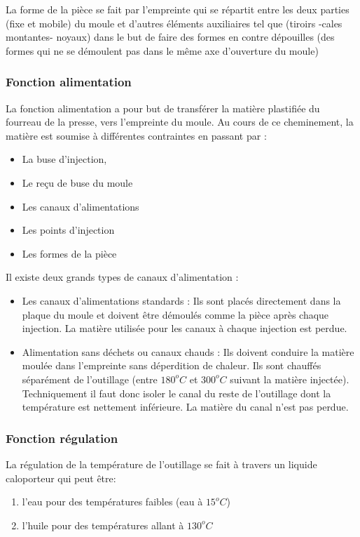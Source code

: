 \documentclass[11pt,oneside]{article}
\begin{document}
        La forme de la pièce se fait par l'empreinte qui se répartit entre les
deux parties (fixe 
et  mobile)  du  moule  et  d'autres  éléments  auxiliaires  tel  que  (tiroirs 
-cales  montantes-
noyaux)  dans  le  but  de  faire  des  formes  en  contre  dépouilles  (des 
formes  qui  ne  se 
démoulent pas dans le même axe d'ouverture du moule) 
        
\subsubsection{Fonction alimentation}

       La fonction alimentation a pour but de transférer la matière plastifiée
du fourreau de 
la presse, vers l'empreinte du moule. Au cours de ce cheminement, la matière est
soumise à 
différentes contraintes en passant par : 
\begin{itemize}
\item La buse d'injection, 
\item Le reçu de buse du moule 
\item Les canaux d'alimentations 
\item Les points d'injection 
\item Les formes de la pièce 
\end{itemize}

        Il existe deux grands types de canaux d'alimentation : 
\begin{itemize}
 \item Les canaux d'alimentations standards : Ils sont placés directement dans
la plaque du moule et doivent être démoulés comme la pièce après chaque
injection. La matière utilisée pour les canaux à chaque injection est perdue. 
\item Alimentation sans déchets ou canaux chauds : Ils doivent conduire la
matière moulée dans  l'empreinte  sans  déperdition  de  chaleur.  Ils 
sont  chauffés séparément  de l'outillage (entre $180^oC$ et $300^oC$
suivant la matière injectée).
Techniquement il faut donc  isoler  le  canal  du  reste  de 
l'outillage  dont  la 
température  est  nettement inférieure. La matière du canal n'est pas perdue. 
\end{itemize}


        \subsubsection{Fonction régulation}
        La régulation de la température de l'outillage se fait à travers un
liquide caloporteur 
qui peut être: 
\begin{enumerate}
 \item l'eau pour des températures faibles (eau à $15^oC$) 
\item l'huile pour des températures allant à $130^oC$ 
\end{enumerate}
\end{document}
